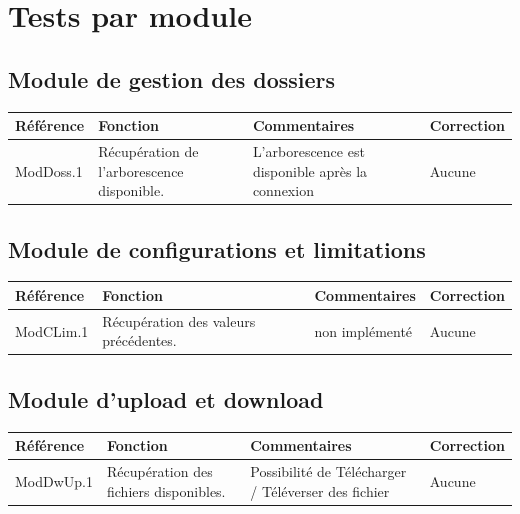 \documentclass[10pt,a4paper,landscape]{report}
\begin{document}

\section{Tests par module}

\subsection{Module de gestion des dossiers}

\begin{center}
	\bgroup
	\def\arraystretch{1.5}
	\begin{tabular}{|p{2.5cm}|p{8cm}|p{8cm}|p{8cm}|}
		\hline
		\rowcolor{gris}Référence & Fonction & Commentaires & Correction\\
		\hline
		ModDoss.1 & Récupération de l'arborescence disponible. & L'arborescence est disponible après la connexion & Aucune \\
		\hline
	\end{tabular}
	\egroup
\end{center}


\subsection{Module de configurations et limitations}

\begin{center}
	\bgroup
	\def\arraystretch{1.5}
	\begin{tabular}{|p{2.5cm}|p{8cm}|p{8cm}|p{8cm}|}
		\hline
		\rowcolor{gris}Référence & Fonction & Commentaires & Correction\\
		\hline
		ModCLim.1 & Récupération des valeurs précédentes. & non implémenté & Aucune \\
		\hline
	\end{tabular}
	\egroup
\end{center}


\subsection{Module d'upload et download}

\begin{center}
	\bgroup
	\def\arraystretch{1.5}
	\begin{tabular}{|p{2.5cm}|p{8cm}|p{8cm}|p{8cm}|}
		\hline
		\rowcolor{gris}Référence & Fonction & Commentaires & Correction\\
		\hline
		ModDwUp.1 & Récupération des fichiers disponibles. & Possibilité de Télécharger / Téléverser des fichier & Aucune \\
		\hline
	\end{tabular}
	\egroup
\end{center}
\end{document}
